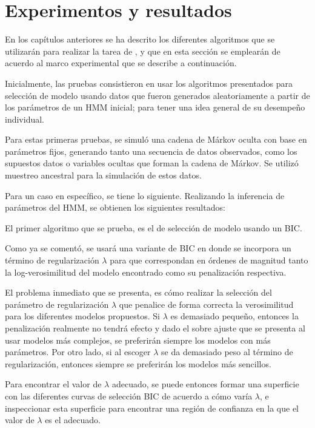 
\chapter{Experimentos y resultados}\label{ch:chap6}


En los capítulos anteriores se ha descrito los diferentes algoritmos que se utilizarán para realizar la tarea de \sd, y que en esta sección se emplearán de acuerdo al marco experimental que se describe a continuación.

Inicialmente, las pruebas consistieron en usar los algoritmos presentados para selección de modelo usando datos que fueron generados aleatoriamente a partir de los parámetros de un \ac{HMM} inicial; para tener una idea general de su desempeño individual.

Para estas primeras pruebas, se simuló una cadena de Márkov oculta con base en parámetros fijos, generando tanto una secuencia de datos observados, como los supuestos datos o variables ocultas que forman la cadena de Márkov. Se utilizó muestreo ancestral para la simulación de estos datos.

Para un caso en específico, se tiene lo siguiente. Realizando la inferencia de parámetros del \ac{HMM}, se obtienen los siguientes resultados:

El primer algoritmo que se prueba, es el de selección de modelo usando un \ac{BIC}.

Como ya se comentó, se usará una variante de \ac{BIC} en donde se incorpora un término de regularización $\lambda$ para que correspondan en órdenes de magnitud tanto la log-verosimilitud del modelo encontrado como su penalización respectiva.

El problema inmediato que se presenta, es cómo realizar la selección del parámetro de regularización $\lambda$ que penalice de forma correcta la verosimilitud para los diferentes modelos propuestos. Si $\lambda$ es demasiado pequeño, entonces la penalización realmente no tendrá efecto y dado el sobre ajuste que se presenta al usar modelos más complejos, se preferirán siempre los modelos con más parámetros. Por otro lado, si al escoger $\lambda$ se da demasiado peso al término de regularización, entonces siempre se preferirán los modelos más sencillos.

Para encontrar el valor de $\lambda$ adecuado, se puede entonces formar una superficie con las diferentes curvas de selección \ac{BIC} de acuerdo a cómo varía $\lambda$, e inspeccionar esta superficie para encontrar una región de confianza en la que el valor de $\lambda$ es el adecuado.

